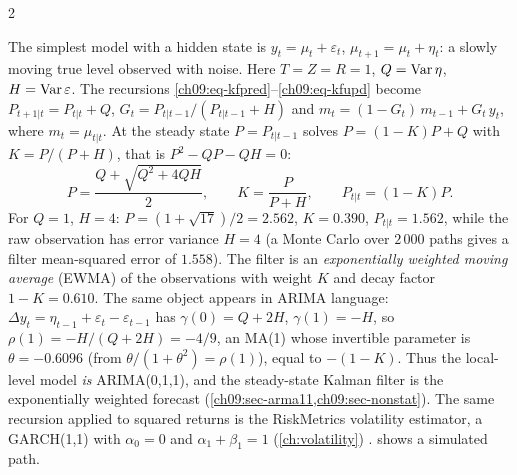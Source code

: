 \begin{paracol}{2}
\begin{example}\label{ch09:ex-locallevel}
The simplest model with a hidden state is $y_t=\mu_t+\varepsilon_t$, $\mu_{t+1}=\mu_t+\eta_t$: a slowly moving true level observed with noise. Here $T=Z=R=1$,
$Q=\operatorname{Var}\eta$, $H=\operatorname{Var}\varepsilon$. The recursions \eqref{ch09:eq-kfpred}--\eqref{ch09:eq-kfupd} become $P_{t+1|t}=P_{t|t}+Q$, $G_t=P_{t|t-1}/(P_{t|t-1}+H)$ and
$m_t=(1-G_t)\,m_{t-1}+G_t\,y_t$, where $m_t=\mu_{t|t}$. At the steady state $P=P_{t|t-1}$ solves $P=(1-K)P+Q$ with $K=P/(P+H)$, that is $P^2-QP-QH=0$:
\[
  P=\frac{Q+\sqrt{Q^2+4QH}}2,\qquad K=\frac P{P+H},\qquad P_{t|t}=(1-K)P .
\]
For $Q=1$, $H=4$: $P=(1+\sqrt{17})/2=2.562$, $K=0.390$, $P_{t|t}=1.562$, while the raw observation has error variance $H=4$
(a Monte Carlo over $2\,000$ paths gives a filter mean-squared error of $1.558$). The filter is an \emph{exponentially weighted moving average} (EWMA) of the observations with
weight $K$ and decay factor $1-K=0.610$. The same object appears in ARIMA language: $\Delta y_t=\eta_{t-1}+\varepsilon_t-\varepsilon_{t-1}$ has $\gamma(0)=Q+2H$, $\gamma(1)=-H$, so
$\rho(1)=-H/(Q+2H)=-4/9$, an MA(1) whose invertible parameter is $\theta=-0.6096$ (from $\theta/(1+\theta^2)=\rho(1)$), equal to $-(1-K)$. Thus the local-level model \emph{is} ARIMA(0,1,1),
and the steady-state Kalman filter is the exponentially weighted forecast (\cref{ch09:sec-arma11,ch09:sec-nonstat}). The same recursion applied to squared returns is the RiskMetrics
volatility estimator, a GARCH(1,1) with $\alpha_0=0$ and $\alpha_1+\beta_1=1$ (\cref{ch:volatility}) .  shows a simulated path.
\end{example}


\end{paracol}
